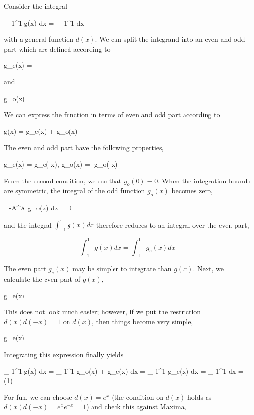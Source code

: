 
Consider the integral

\bee
\int_{-1}^1 g(x) dx = \int_{-1}^1  dx
\eee

with a general function $d(x)$. We can split the integrand into an even and odd part which are defined according to

\bee
g_e(x) = 
\eee

and

\bee
g_o(x) = 
\eee

We can express the function in terms of even and odd part according to

\bee
g(x) = g_e(x) + g_o(x)
\eee

The even and odd part have the following properties,

\bee
g_e(x) = g_e(-x), \quad g_o(x) = -g_o(-x)
\eee

From the second condition, we see that $g_o(0) = 0$. When the integration bounds are symmetric, the integral of the odd function $g_o(x)$ becomes zero,

\bee
\int_{-A}^A g_o(x) dx = 0
\eee

and the integral $\int_{-1}^1 g(x) dx$ therefore reduces to an integral over the even part,

\[
\int_{-1}^1 g(x) dx = \int_{-1}^1 g_e(x) dx
\]

The even part $g_e(x)$ may be simpler to integrate than $g(x)$. Next, we calculate the even part of $g(x)$,

\bee
g_e(x) =   =   
\eee

This does not look much easier; however, if we put the restriction $d(x)d(-x) = 1$ on $d(x)$, then things become very simple,

\bee
g_e(x) =    = 
\eee

Integrating this expression finally yields

\bee
\int_{-1}^1 g(x) dx = \int_{-1}^1 g_o(x) + g_e(x) dx = \int_{-1}^1 g_e(x) dx = \int_{-1}^1  dx = \sin(1)
\eee

For fun, we can choose $d(x) = e^x$ (the condition on $d(x)$ holds as $d(x)d(-x) = e^x e^{-x} = 1$) and check this against Maxima,

